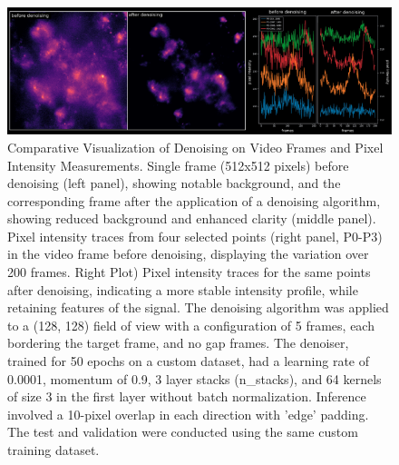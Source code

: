 \begin{figure}[h!]
\begin{center}
\includegraphics[width=\linewidth]{figures/3.png}
\end{center}
\caption{Comparative Visualization of Denoising on Video Frames and Pixel Intensity Measurements. Single frame (512x512 pixels) before denoising (left panel), showing notable background, and the corresponding frame after the application of a denoising algorithm, showing reduced background and enhanced clarity (middle panel). Pixel intensity traces from four selected points (right panel, P0-P3) in the video frame before denoising, displaying the variation over 200 frames. Right Plot) Pixel intensity traces for the same points after denoising, indicating a more stable intensity profile, while retaining features of the signal. The denoising algorithm was applied to a (128, 128) field of view with a configuration of 5 frames, each bordering the target frame, and no gap frames. The denoiser, trained for 50 epochs on a custom dataset, had a learning rate of 0.0001, momentum of 0.9, 3 layer stacks (n\_stacks), and 64 kernels of size 3 in the first layer without batch normalization. Inference involved a 10-pixel overlap in each direction with 'edge' padding. The test and validation were conducted using the same custom training dataset.
}\label{fig:3}
\end{figure}

